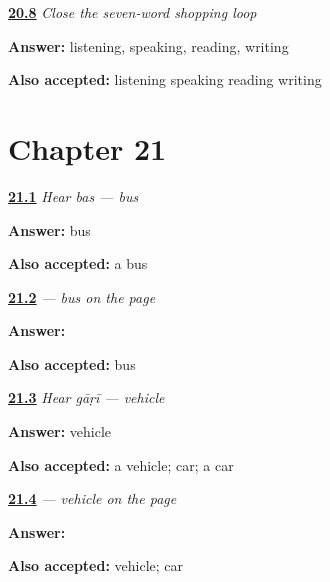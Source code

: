\noindent\begin{minipage}[t]{\linewidth}
\raggedright
\hyperlink{review-MW-R15-shopping-close-recall}{\textbf{20.8}} \emph{Close the seven-word shopping loop}\par
\small \textbf{Answer:} listening, speaking, reading, writing\par
\footnotesize \textbf{Also accepted:} listening speaking reading writing
\end{minipage}\par\medskip

\section*{Chapter 21}

\noindent\begin{minipage}[t]{\linewidth}
\raggedright
\hyperlink{review-MW-C16-hear-bas-meaning}{\textbf{21.1}} \emph{Hear \emph{bas} — bus}\par
\small \textbf{Answer:} bus\par
\footnotesize \textbf{Also accepted:} a bus
\end{minipage}\par\medskip

\noindent\begin{minipage}[t]{\linewidth}
\raggedright
\hyperlink{review-MW-C16-bas-dictation}{\textbf{21.2}} \emph{ — bus on the page}\par
\small \textbf{Answer:} \par
\footnotesize \textbf{Also accepted:}  bus
\end{minipage}\par\medskip

\noindent\begin{minipage}[t]{\linewidth}
\raggedright
\hyperlink{review-MW-C16-hear-gaadi-meaning}{\textbf{21.3}} \emph{Hear \emph{gāṛī} — vehicle}\par
\small \textbf{Answer:} vehicle\par
\footnotesize \textbf{Also accepted:} a vehicle; car; a car
\end{minipage}\par\medskip

\noindent\begin{minipage}[t]{\linewidth}
\raggedright
\hyperlink{review-MW-C16-gaadi-dictation}{\textbf{21.4}} \emph{ — vehicle on the page}\par
\small \textbf{Answer:} \par
\footnotesize \textbf{Also accepted:}  vehicle;  car
\end{minipage}\par\medskip

